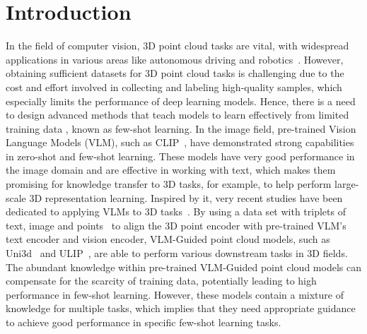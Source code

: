 \documentclass{ecai}
\begin{document}
\section{Introduction}

In the field of computer vision, 3D point cloud tasks are vital, with widespread applications in various areas like autonomous driving and robotics~\cite{chen2023fastc, bualașa2021lidar,du2024pcl}. 
However, obtaining sufficient datasets for 3D point cloud tasks is challenging due to the cost and effort involved in collecting and labeling high-quality samples, which especially limits the performance of deep learning models.
Hence, there is a need to design advanced methods that teach models to learn effectively from limited training data \cite{pang2022beyond,pang2021tumor,lu2024uniads}, known as few-shot learning.
In the image field, pre-trained Vision Language Models (VLM), such as CLIP~\cite{radford2021learning}, have demonstrated strong capabilities in zero-shot and few-shot learning. 
These models have very good performance in the image domain and are effective in working with text, which makes them promising for knowledge transfer to 3D tasks, for example, to help perform large-scale 3D representation learning.
Inspired by it, very recent studies have been dedicated to applying VLMs to 3D tasks~\cite{zhang2022pointclip,zhu2023pointclip,xue2023ulip,zhang2023uni3d}.
By using a data set with triplets of text, image and points~\cite{xue2023ulip,deitke2023objaverse} 
to align the 3D point encoder with pre-trained VLM's text encoder and vision encoder, VLM-Guided point cloud models, such as Uni3d~\cite{zhang2023uni3d} and ULIP~\cite{xue2023ulip}, are able to perform various downstream tasks in 3D fields. The abundant knowledge within pre-trained VLM-Guided point cloud models can compensate for the scarcity of training data, potentially leading to high performance in few-shot learning. However, these models contain a mixture of knowledge for multiple tasks, which implies that they need appropriate guidance to achieve good performance in specific few-shot learning tasks.
\end{document}
